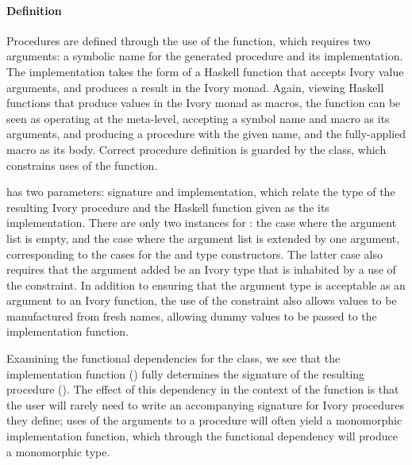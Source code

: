 \paragraph{Definition}

Procedures are defined through the use of the  function, which requires
two arguments: a symbolic name for the generated procedure and its
implementation.  The implementation takes the form of a Haskell function that
accepts Ivory value arguments, and produces a result in the Ivory monad.  Again,
viewing Haskell functions that produce values in the Ivory monad as macros, the
 function can be seen as operating at the meta-level, accepting a
symbol name and macro as its arguments, and producing a procedure with the given
name, and the fully-applied macro as its body.  Correct procedure definition is
guarded by the  class, which constrains uses of the 
function. 

 has two parameters: signature and implementation, which relate
the  type of the resulting Ivory procedure and the Haskell function
given as the its implementation.  There are only two instances for
: the case where the argument list is empty, and the case where
the argument list is extended by one argument, corresponding to the cases for
the  and  type constructors.  The latter case also requires
that the argument added be an Ivory type that is inhabited by a use of the
 constraint.  In addition to ensuring that the argument type is
acceptable as an argument to an Ivory function, the use of the 
constraint also allows values to be manufactured from fresh names, allowing
dummy values to be passed to the implementation function.

Examining the functional dependencies for the  class, we see
that the implementation function () fully determines the signature of
the resulting procedure ().  The effect of this dependency in the
context of the  function is that the user will rarely need to write an
accompanying  signature for Ivory procedures they define; uses of the
arguments to a procedure will often yield a monomorphic implementation function,
which through the functional dependency will produce a monomorphic 
type.


